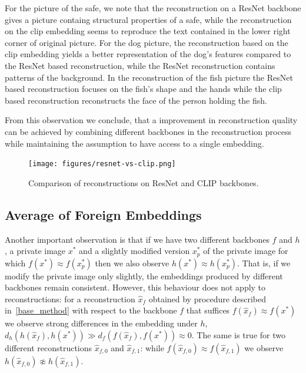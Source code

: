 \documentclass[10pt,twocolumn]{article}
\begin{document}
For the picture of the safe, we note that the reconstruction on a ResNet backbone gives a picture containg structural properties of a safe, while the reconstruction on the clip embedding seems to reproduce the text contained in the lower right corner of original picture.
For the dog picture, the reconstruction based on the clip embedding yields a better representation of the dog's features compared to the ResNet based reconstruction, while the ResNet reconstruction contains patterns of the background.
In the reconstruction of the fish picture the ResNet based reconstruction focuses on the fish's shape and the hands while the clip based reconstruction reconstructs the face of the person holding the fish.

From this observation we conclude, that a improvement in reconstruction quality can be achieved by combining different backbones in the reconstruction process while maintaining the assumption to have access to a single embedding.
\begin{figure}[ht]
    \centering
    \texttt{[image: figures/resnet-vs-clip.png]}
    \caption{
        Comparison of reconstructions on ResNet and CLIP backbones.
    }
    \label{fig:resnet_vs_clip}
\end{figure}

\subsection{Average of Foreign Embeddings}
Another important observation is that if we have two different backbones $f$ and $h$, a private image $x^*$ and a slightly modified version $x^*_p$ of the private image for which $f(x^*)\approx f(x^*_p)$ then we also observe $h(x^*)\approx h(x^*_p)$.
That is, if we modify the private image only slightly, the embeddings produced by different backbones remain consistent.
However, this behaviour does not apply to reconstructions: for a reconstruction $\hat x_f$ obtained by procedure described in~\ref{base_method} with respect to the backbone $f$ that suffices $f(\hat x_f)\approx f(x^*)$ we observe strong differences in the embedding under $h$, $d_h(h(\hat x_f),h(x^*)) \gg d_f(f(\hat x_f),f(x^*))\approx 0$.
The same is true for two different reconstructions $\hat x_{f,0}$ and $\hat x_{f,1}$: while $f(\hat x_{f,0})\approx f(\hat x_{f,1})$ we observe $h(\hat x_{f,0})\not\approx h(\hat x_{f,1})$.
\end{document}
